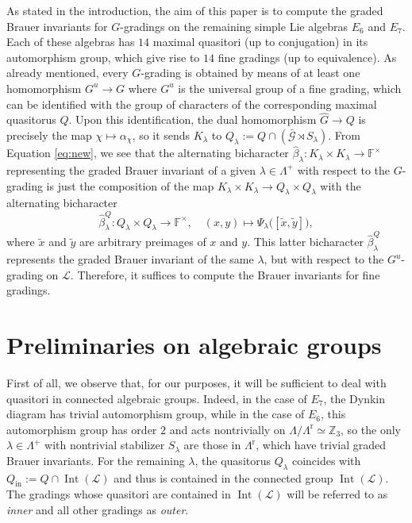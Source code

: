 \documentclass[a4paper,reqno]{amsart}
\theoremstyle{definition}
\numberwithin{theorem}{section}
\numberwithin{equation}{section}
\begin{document}
As stated in the introduction, the aim of this paper is to compute the graded Brauer invariants for $G$-gradings on the remaining simple Lie algebras $E_6$ and $E_7$. Each of these algebras has $14$ maximal quasitori (up to conjugation) in its automorphism group, which give rise to $14$ fine gradings (up to equivalence). As already mentioned, every $G$-grading is obtained by means of at least one homomorphism $G^u\to G$ where $G^u$ is the universal group of a fine grading, which can be identified with the group of characters of the corresponding maximal quasitorus $Q$. Upon this identification, the dual homomorphism ${\widehat{{G}}}\to Q$ is precisely the map $\chi\mapsto\alpha_{\chi}$, so it sends $K_\lambda$ to $Q_\lambda{:=} Q\cap(\bar{\mathcal{G}}\rtimes S_\lambda)$. From Equation \eqref{eq:new}, we see that the alternating bicharacter $\hat{\beta}_\lambda\colon K_\lambda\times K_\lambda\to{\mathbb{F}}^\times$ representing the graded Brauer invariant of a given $\lambda\in\Lambda^+$ with respect to the $G$-grading is just the composition of the map $K_\lambda\times K_\lambda\to Q_\lambda\times Q_\lambda$ with the alternating bicharacter 
\begin{equation}\label{eq:bichar_for_Q}
\hat{\beta}_\lambda^Q\colon Q_\lambda\times Q_\lambda\to{\mathbb{F}}^\times,\quad (x,y)\mapsto \Psi_\lambda\bigl([\tilde{x},\tilde{y}]\bigr),
\end{equation}
where $\tilde x$ and $\tilde y$ are arbitrary preimages of $x$ and $y$. This latter bicharacter $\hat{\beta}_\lambda^Q$ represents the graded Brauer invariant of the same $\lambda$, but with respect to the $G^u$-grading on ${\mathcal{L}}$. 
Therefore, it suffices to compute the Brauer invariants for fine gradings.

\section{Preliminaries on algebraic groups}\label{se:prelim}

First of all, we observe that, for our purposes, it will be sufficient to deal with quasitori in connected algebraic groups. Indeed, in the case of $E_7$, the Dynkin diagram has trivial automorphism group, while in the case of $E_6$, this automorphism group has order $2$ and acts nontrivially on $\Lambda/\Lambda^\mathrm{r}\simeq{\mathbb{Z}}_3$, so the only $\lambda\in\Lambda^+$ with nontrivial stabilizer $S_\lambda$ are those in $\Lambda^\mathrm{r}$, which have trivial graded Brauer invariants. For the remaining $\lambda$, the quasitorus $Q_\lambda$ coincides with $Q_\mathrm{in}{:=} Q\cap\operatorname{\mathrm{Int}}({\mathcal{L}})$ and thus is contained in the connected group $\operatorname{\mathrm{Int}}({\mathcal{L}})$. The gradings whose quasitori are contained in $\operatorname{\mathrm{Int}}({\mathcal{L}})$ will be referred to as \emph{inner} and all other gradings as \emph{outer}.
\end{document}
